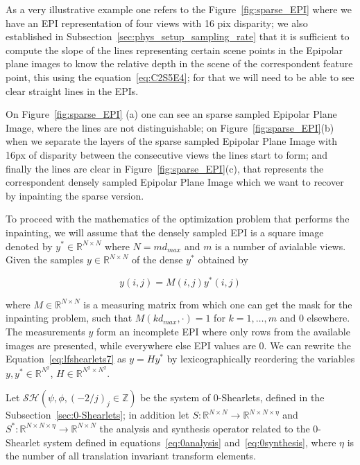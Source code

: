 \bigskip


As a very illustrative example one refers to the Figure~\ref{fig:sparse_EPI} where we have an EPI representation of four views with 16 pix disparity; we also established in Subsection~\ref{sec:phys_setup_sampling_rate} that it is sufficient to compute the slope of the lines representing certain scene points in the Epipolar plane images to know the relative depth in the scene of the correspondent feature point, this using the equation~\ref{eq:C2S5E4}; for that we will need to be able to see clear straight lines in the EPIs.

\bigskip

On Figure~\ref{fig:sparse_EPI} (a) one can see an sparse sampled Epipolar Plane Image, where the lines are not distinguishable; on Figure~\ref{fig:sparse_EPI}(b) when we separate the layers of the sparse sampled Epipolar Plane Image with 16px of disparity between the consecutive views the lines start to form; and finally the lines are clear in Figure~\ref{fig:sparse_EPI}(c), that represents the correspondent densely sampled Epipolar Plane Image which we want to recover by inpainting the sparse version. 

\bigskip

To proceed with the mathematics of the optimization problem that performs the inpainting, we will assume that the densely sampled EPI is a square image denoted by $y^*\in \mathbb{R}^{N\times N}$ where $N=md_{max}$ and $m$ is a number of avialable views. Given the samples $y\in\mathbb{R}^{N\times N}$ of the dense $y^*$ obtained by 

\begin{equation}
\label{eq:lfshearlets7}
y(i,j)=M(i,j)y^*(i,j)
\end{equation}

where $M\in\mathbb{R}^{N\times N}$ is a measuring matrix from which one can get the mask for the inpainting problem, such that $M(kd_{max},\cdot)=1$ for $k=1,\ldots,m$ and $0$ elsewhere. The measurements $y$ form an incomplete EPI where only rows from the available images are presented, while everywhere else EPI values are $0$. We can rewrite the Equation~\ref{eq:lfshearlets7} as $y=Hy^*$ by lexicographically reordering the variables $y,y^*\in \mathbb{R}^{N^2}$, $H\in\mathbb{R}^{N^2\times N^2}$. 

\bigskip 

Let $\mathcal{SH}(\psi,\phi,(-2/j)_j\in\mathbb{Z})$ be the system of $0$-Shearlets, defined in the Subsection~\ref{sec:0-Shearlets}; in addition let $S:\mathbb{R}^{N\times N}\longrightarrow \mathbb{R}^{N\times N\times\eta}$ and $S^*: \mathbb{R}^{N\times N\times\eta}\longrightarrow \mathbb{R}^{N\times N}$ the analysis and synthesis operator related to the $0$-Shearlet system defined in equations~\ref{eq:0analysis} and~\ref{eq:0synthesis}, where $\eta$ is the number of all translation invariant transform elements.

